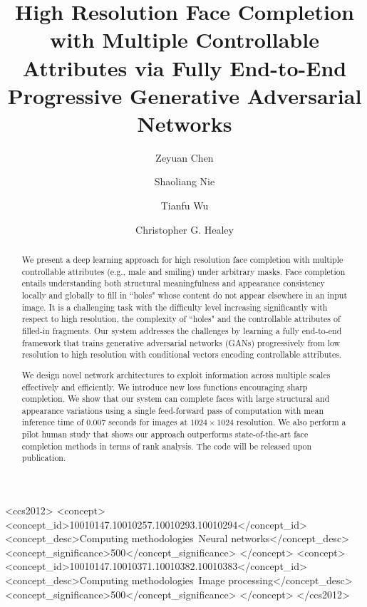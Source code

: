 \documentclass[acmtog,timestamp]{acmart}
\begin{document}
\title{High Resolution Face Completion with Multiple Controllable Attributes via Fully End-to-End Progressive Generative Adversarial Networks}


\author{Zeyuan Chen}

\author{Shaoliang Nie}
\author{Tianfu Wu}
\author{Christopher G. Healey}

\renewcommand\shortauthors{}

\begin{abstract}
We present a deep learning approach for high resolution face completion with multiple controllable attributes (e.g., male and smiling) under arbitrary masks.  Face completion entails understanding both structural meaningfulness and appearance consistency locally and globally to fill in ``holes" whose content do not appear elsewhere in an input image. It is a challenging task with the difficulty level increasing significantly with respect to high resolution, the complexity of ``holes" and the controllable attributes of filled-in fragments. Our system addresses the challenges by learning a fully end-to-end framework that trains generative adversarial networks (GANs) progressively from low resolution to  high resolution with conditional vectors encoding controllable attributes.

We design novel network architectures to exploit information across multiple scales effectively and efficiently. We introduce new loss functions encouraging sharp completion. We show that our system can complete faces with large structural and appearance variations using a single feed-forward pass of computation with mean inference time of 0.007 seconds for images at $1024\times 1024$ resolution. We also perform a pilot human study that shows our approach outperforms state-of-the-art face completion methods in terms of rank analysis. The code will be released upon publication. 
\end{abstract}



\begin{CCSXML}
<ccs2012>
<concept>
<concept_id>10010147.10010257.10010293.10010294</concept_id>
<concept_desc>Computing methodologies~Neural networks</concept_desc>
<concept_significance>500</concept_significance>
</concept>
<concept>
<concept_id>10010147.10010371.10010382.10010383</concept_id>
<concept_desc>Computing methodologies~Image processing</concept_desc>
<concept_significance>500</concept_significance>
</concept>
</ccs2012>
\end{CCSXML}
\end{document}

